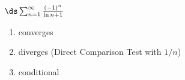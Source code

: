 {$\ds \sum_{n=1}^\infty \frac{(-1)^{n}}{\ln n+1}$
}
{\begin{enumerate}
	\item converges
	\item	diverges (Direct Comparison Test with $1/n$)
	\item conditional
\end{enumerate}
}